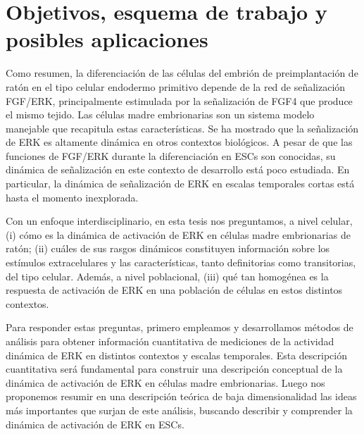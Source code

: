 \documentclass[./main.tex]{subfiles}
\begin{document}
\section{Objetivos, esquema de trabajo y posibles aplicaciones}


Como resumen, la diferenciación de las células del embrión de preimplantación de ratón en el tipo celular endodermo primitivo depende de la red de señalización FGF/ERK, principalmente estimulada por la señalización de FGF4 que produce el mismo tejido. Las células madre embrionarias son un sistema modelo manejable que recapitula estas características. Se ha mostrado que la señalización de ERK es altamente dinámica en otros contextos biológicos. A pesar de que las funciones de FGF/ERK durante la diferenciación en ESCs son conocidas, su dinámica de señalización en este contexto de desarrollo está poco estudiada. En particular, la dinámica de señalización de ERK en escalas temporales cortas está hasta el momento inexplorada.


Con un enfoque interdisciplinario, en esta tesis nos preguntamos, a nivel celular, (i) cómo es la dinámica de activación de ERK en células madre embrionarias de ratón; (ii) cuáles de sus rasgos dinámicos constituyen información sobre los estímulos extracelulares y las características, tanto definitorias como transitorias, del tipo celular. Además, a nivel poblacional, (iii) qué tan homogénea es la respuesta de activación de ERK en una población de células en estos distintos contextos.


Para responder estas preguntas, primero empleamos y desarrollamos métodos de análisis para obtener información cuantitativa de mediciones de la actividad dinámica de ERK en distintos contextos y escalas temporales. Esta descripción cuantitativa será fundamental para construir una descripción conceptual de la dinámica de activación de ERK en células madre embrionarias. Luego nos proponemos resumir en una descripción teórica de baja dimensionalidad las ideas más importantes que surjan de este análisis, buscando describir y comprender la dinámica de activación de ERK en ESCs.
\end{document}
